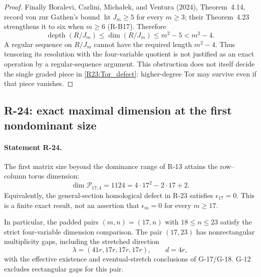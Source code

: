 \begin{proof}
Finally Boralevi, Carlini, Micha{\l}ek, and Ventura (2024),
Theorem~4.14, record von zur Gathen's bound
$\operatorname{ht}J_m\geq5$ for every $m\geq3$; their Theorem~4.23
strengthens it to six when $m\geq6$ (R-B17). Therefore
\[
 \operatorname{depth}(R/J_m)
 \leq\dim(R/J_m)\leq m^2-5<m^2-4.
\]
A regular sequence on $R/J_m$ cannot have the required length
$m^2-4$. Thus tensoring its resolution with the four-variable
quotient is not justified as an exact operation by a regular-sequence
argument. This obstruction does not itself decide the single graded
piece in \eqref{R23:Tor_defect}: higher-degree Tor may survive even
if that piece vanishes.
\end{proof}



\subsection{R-24: exact maximal dimension at the first nondominant size}

\paragraph{Statement R-24.}
The first matrix size beyond the dominance range of R-13 attains
the row--column torus dimension:
\begin{equation}\label{R24:exact}
 \dim\mathcal P_{17,4}=1124=4\cdot17^2-2\cdot17+2.
\end{equation}
Equivalently, the general-section homological defect in R-23 satisfies
$\epsilon_{17}=0$. This is a finite exact result, not an assertion
that $\epsilon_m=0$ for every $m\geq17$.

In particular, the padded pairs $(m,n)=(17,n)$ with
$18\leq n\leq23$ satisfy the strict four-variable dimension
comparison. The pair $(17,23)$ has nonrectangular multiplicity gaps,
including the stretched direction
\[
 \lambda=(41r,17r,17r,17r),\qquad d=4r,
\]
with the effective existence and eventual-stretch conclusions of
G-17/G-18. G-12 excludes rectangular gaps for this pair.

